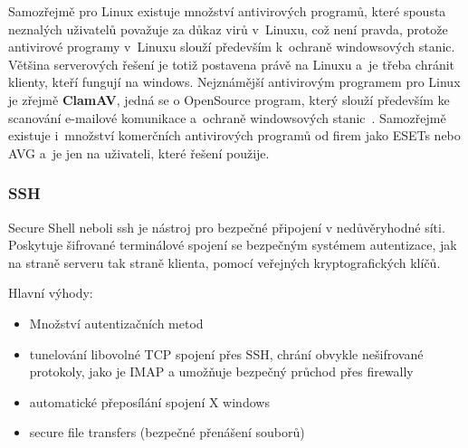 \documentclass[a4paper,12pt]{article}
\renewcommand{\b}[1]{\textbf{#1}} %
\begin{document}
Samozřejmě pro Linux existuje množství antivirových programů, které spousta neznalých uživatelů považuje za důkaz virů v~Linuxu, což není pravda, protože antivirové programy v~Linuxu slouží především k~ochraně windowsových stanic. Většina serverových řešení je totiž postavena právě na Linuxu a~je třeba chránit klienty, kteří fungují na windows. Nejznámější antivirovým programem pro Linux je zřejmě \b{ClamAV}, jedná se o OpenSource program, který slouží především ke scanování e-mailové komunikace a~ochraně windowsových stanic~\cite{ClamAV}. Samozřejmě existuje i~množství komerčních antivirových programů od firem jako ESETs nebo AVG a~je jen na uživateli, které řešení použije.

\subsubsection{SSH}
Secure Shell neboli ssh je nástroj pro bezpečné připojení v nedůvěryhodné síti. Poskytuje šifrované terminálové spojení se bezpečným systémem autentizace, jak na straně serveru tak straně klienta, pomocí veřejných kryptografických klíčů.

Hlavní výhody:
\begin{itemize}
 \item Množství autentizačních metod
 \item tunelování libovolné TCP spojení přes SSH, chrání obvykle nešifrované protokoly, jako je IMAP a umožňuje bezpečný průchod přes firewally
 \item automatické přeposílání spojení X windows
 \item secure file transfers (bezpečné přenášení souborů)
\end{itemize}
\end{document}
